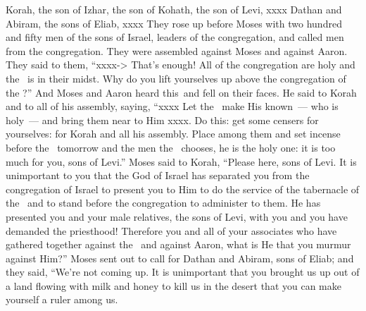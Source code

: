 
\begin{inparaenum}
   Korah, the son of Izhar, the son of Kohath, the son of Levi, xxxx Dathan and Abiram, the sons of Eliab, xxxx%
   They rose up before Moses with two hundred and fifty men of the sons of Israel, leaders of the congregation, and called men from the congregation.%
   They were assembled against Moses and against Aaron. They said to them, ``xxxx-> That's enough! All of the congregation are holy and the \lord\ is in their midst. Why do you lift yourselves up above the congregation of the \lord?''%
   And Moses and Aaron heard this\understood\ and fell on their faces.%
   He said to Korah and to all of his assembly, saying, ``xxxx Let the \lord\ make His known~--- who is holy~--- and bring them near to Him xxxx.%
   Do this: get some censers for yourselves: for Korah and all his assembly.%
   Place among them and set incense before the \lord\ tomorrow and the men the \lord\ chooses, he is the holy one: it is too much for you, sons of Levi.''%
   Moses said to Korah, ``Please here, sons of Levi.%
   It is unimportant to you that the God of Israel has separated you from the congregation of Israel to present you to Him to do the service of the tabernacle of the \lord\ and to stand before the congregation to administer to them.%
   He has presented you and your male relatives, the sons of Levi, with you and you have demanded the priesthood!%
   Therefore you and all of your associates who have gathered together against the \lord\ and against Aaron, what is He that you murmur against Him?''%
   Moses sent out to call for Dathan and Abiram, sons of Eliab; and they said, ``We're not coming up.%
   It is unimportant that you brought us up out of a land flowing with milk and honey to kill us in the desert that you can make yourself a ruler among us.%

\end{inparaenum}
